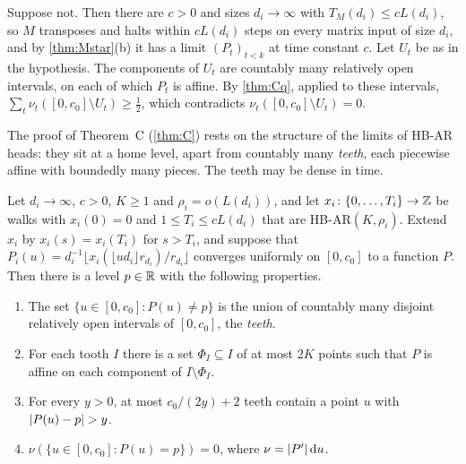 \begin{informalproof}
Suppose not. Then there are $c>0$ and sizes $d_i\to\infty$ with $T_M(d_i)\le cL(d_i)$, so $M$ transposes and halts
within $cL(d_i)$ steps on every matrix input of size $d_i$, and by \cref{thm:Mstar}(b) it has a limit $(P_t)_{t<k}$ at
time constant $c$. Let $U_t$ be as in the hypothesis. The components of $U_t$ are countably many relatively open
intervals, on each of which $P_t$ is affine. By \cref{thm:Cq}, applied to these intervals, $\sum_t\nu_t([0,c_0]\setminus
U_t)\ge\frac12$, which contradicts $\nu_t([0,c_0]\setminus U_t)=0$.
\end{informalproof}

The proof of Theorem~C (\cref{thm:C}) rests on the structure of the limits of HB-AR heads: they sit at a home level,
apart from countably many \emph{teeth}, each piecewise affine with boundedly many pieces. The teeth may be dense in time.

\begin{lemma}\label{lem:mot-teeth}
\notformalized
Let $d_i\to\infty$, $c>0$, $K\ge1$ and $\rho_i=o(L(d_i))$, and let $x_i\colon\{0,\dots,T_i\}\to\mathbb{Z}$ be walks with
$x_i(0)=0$ and $1\le T_i\le cL(d_i)$ that are HB-AR$(K,\rho_i)$. Extend $x_i$ by $x_i(s)=x_i(T_i)$ for $s>T_i$, and suppose
that $P_i(u)=d_i^{-1}\lfloor x_i(\lfloor ud_i\rfloor r_{d_i})/r_{d_i}\rfloor$ converges uniformly on $[0,c_0]$ to a
function $P$. Then there is a level $p\in\mathbb{R}$ with the following properties.
\begin{enumerate}[label=(\alph*)]
\item The set $\{u\in[0,c_0]:P(u)\ne p\}$ is the union of countably many disjoint relatively open intervals of
$[0,c_0]$, the \emph{teeth}.
\item For each tooth $I$ there is a set $\Phi_I\subseteq I$ of at most $2K$ points such that $P$ is affine on each
component of $I\setminus\Phi_I$.
\item For every $y>0$, at most $c_0/(2y)+2$ teeth contain a point $u$ with $\lvert P(u)-p \rvert>y$.
\item $\nu(\{u\in[0,c_0]:P(u)=p\})=0$, where $\nu=\lvert P' \rvert\,\mathrm du$.
\end{enumerate}
\end{lemma}

